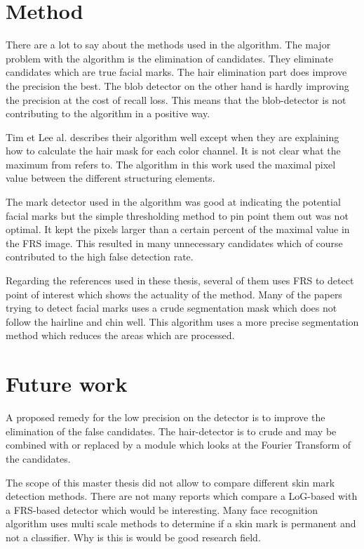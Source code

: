 \section{Method}

There are a lot to say about the methods used in the algorithm. The major problem with the algorithm is the elimination of candidates. They eliminate candidates which are true facial marks. The hair elimination part does improve the precision the best. The blob detector on the other hand is hardly improving the precision at the cost of recall loss. This means that the blob-detector is not contributing to the algorithm in a positive way.

Tim et Lee al. describes their algorithm well except when they are explaining how to calculate the hair mask for each color channel. It is not clear what the maximum from refers to. The algorithm in this work used the maximal pixel value between the different structuring elements. 

The mark detector used in the algorithm was good at indicating the potential facial marks but the simple thresholding method to pin point them out was not optimal. It kept the pixels larger than a certain percent of the maximal value in the FRS image. This resulted in many unnecessary candidates which of course contributed to the high false detection rate. 

Regarding the references used in these thesis, several of them uses FRS to detect point of interest which shows the actuality of the method. Many of the papers trying to detect facial marks uses a crude segmentation mask which does not follow the hairline and chin well. This algorithm uses a more precise segmentation method which reduces the areas which are processed. 


\section{Future work}

A proposed remedy for the low precision on the detector is to improve the elimination of the false candidates. The hair-detector is to crude and may be combined with or replaced by a module which looks at the Fourier Transform of the candidates. 

The scope of this master thesis did not allow to compare different skin mark detection methods. There are not many reports which compare a LoG-based with a FRS-based detector which would be interesting. Many face recognition algorithm uses multi scale methods to determine if a skin mark is permanent and not a classifier. Why is this is would be good research field.   


